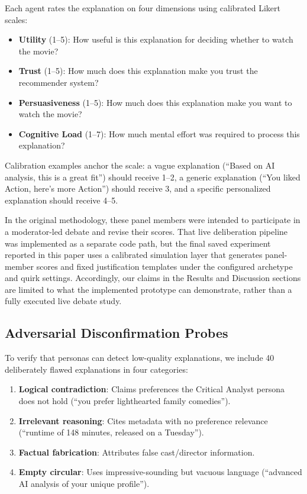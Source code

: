 \documentclass[sigconf,nonacm]{acmart}
\begin{document}
Each agent rates the explanation on four dimensions using calibrated Likert scales:

\begin{itemize}[leftmargin=*]
\item \textbf{Utility} (1--5): How useful is this explanation for deciding whether to watch the movie?
\item \textbf{Trust} (1--5): How much does this explanation make you trust the recommender system?
\item \textbf{Persuasiveness} (1--5): How much does this explanation make you want to watch the movie?
\item \textbf{Cognitive Load} (1--7): How much mental effort was required to process this explanation?
\end{itemize}

Calibration examples anchor the scale: a vague explanation (``Based on AI analysis, this is a great fit'') should receive 1--2, a generic explanation (``You liked Action, here's more Action'') should receive 3, and a specific personalized explanation should receive 4--5.

In the original methodology, these panel members were intended to participate in a moderator-led debate and revise their scores. That live deliberation pipeline was implemented as a separate code path, but the final saved experiment reported in this paper uses a calibrated simulation layer that generates panel-member scores and fixed justification templates under the configured archetype and quirk settings. Accordingly, our claims in the Results and Discussion sections are limited to what the implemented prototype can demonstrate, rather than a fully executed live debate study.

\subsection{Adversarial Disconfirmation Probes}

To verify that personas can detect low-quality explanations, we include 40 deliberately flawed explanations in four categories:

\begin{enumerate}[leftmargin=*]
\item \textbf{Logical contradiction}: Claims preferences the Critical Analyst persona does not hold (``you prefer lighthearted family comedies'').
\item \textbf{Irrelevant reasoning}: Cites metadata with no preference relevance (``runtime of 148 minutes, released on a Tuesday'').
\item \textbf{Factual fabrication}: Attributes false cast/director information.
\item \textbf{Empty circular}: Uses impressive-sounding but vacuous language (``advanced AI analysis of your unique profile'').
\end{enumerate}
\end{document}
